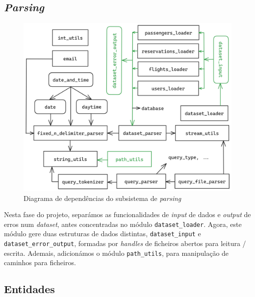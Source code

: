 \documentclass[12pt, a4paper]{article}
\begin{document}

\subsection{\emph{Parsing}}
\label{sec:parsing}

\begin{figure}[ht]
    \centering
    \includegraphics[scale=0.17]{res-fase2/parsing.png}
    \caption{Diagrama de dependências do subsistema de \emph{parsing}}
    \label{fig:parsing}
\end{figure}

Nesta fase do projeto, separámos as funcionalidades de \emph{input} de dados e \emph{output} de
erros num \emph{dataset}, antes concentradas no módulo \texttt{dataset\_loader}. Agora, este módulo
gere duas estruturas de dados distintas, \texttt{dataset\_input} e \texttt{dataset\_error\_output},
formadas por \emph{handles} de ficheiros abertos para leitura / escrita. Ademais, adicionámos o
módulo \texttt{path\_utils}, para manipulação de caminhos para ficheiros.

\subsection{Entidades}
\label{sec:entities}
\end{document}
